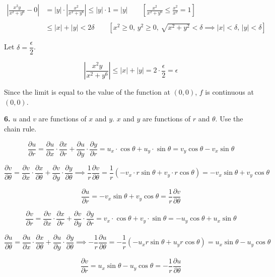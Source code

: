 \documentclass{article}
\begin{document}
\begin{align*}\left|\frac{x^2y}{x^2+y^6}-0\right|&=|y|\cdot\left|\frac{x^2}{x^2+y^6}\right|\leq|y|\cdot1=|y|\qquad\left[\frac{x^2}{x^2+y^6}\leq\frac{x^2}{x^2}=1\right]\\\\&\leq|x|+|y|<2\delta\qquad\left[x^2\geq0,\,y^2\geq0,\,\sqrt{x^2+y^2}<\delta\implies|x|<\delta,\,|y|<\delta\right]\end{align*}

Let $\delta=\dfrac\epsilon2$.

\[\left|\frac{x^2y}{x^2+y^6}\right|\leq|x|+|y|=2\cdot\frac\epsilon2=\epsilon\]

Since the limit is equal to the value of the function at $(0,0)$, $f$ is continuous at $(0,0)$.

\textbf{6.} $u$ and $v$ are functions of $x$ and $y$. $x$ and $y$ are functions of $r$ and $\theta$. Use the chain rule.

\[\frac{\partial u}{\partial r}=\frac{\partial u}{\partial x}\cdot\frac{\partial x}{\partial r}+\frac{\partial u}{\partial y}\cdot\frac{\partial y}{\partial r}=u_x\cdot\cos\theta+u_y\cdot\sin\theta=v_y\cos\theta-v_x\sin\theta\]

\[\frac{\partial v}{\partial\theta}=\frac{\partial v}{\partial x}\cdot\frac{\partial x}{\partial\theta}+\frac{\partial v}{\partial y}\cdot\frac{\partial y}{\partial\theta}\implies\frac1r\frac{\partial v}{\partial\theta}=\frac1r\left(-v_x\cdot r\sin\theta+v_y\cdot r\cos\theta\right)=-v_x\sin\theta+v_y\cos\theta\]

\[\frac{\partial u}{\partial r}=-v_x\sin\theta+v_y\cos\theta=\frac1r\frac{\partial v}{\partial\theta}\]

\[\frac{\partial v}{\partial r}=\frac{\partial v}{\partial x}\cdot\frac{\partial x}{\partial r}+\frac{\partial v}{\partial y}\cdot\frac{\partial y}{\partial r}=v_x\cdot\cos\theta+v_y\cdot\sin\theta=-u_y\cos\theta+u_x\sin\theta\]

\[\frac{\partial u}{\partial\theta}=\frac{\partial u}{\partial x}\cdot\frac{\partial x}{\partial\theta}+\frac{\partial u}{\partial y}\cdot\frac{\partial y}{\partial\theta}\implies-\frac1r\frac{\partial u}{\partial\theta}=-\frac1r\left(-u_x r\sin\theta+u_y r\cos\theta\right)=u_x\sin\theta-u_y\cos\theta\]

\[\frac{\partial v}{\partial r}=u_x\sin\theta-u_y\cos\theta=-\frac1r\frac{\partial u}{\partial \theta}\]

\vspace{1em}
\end{document}
